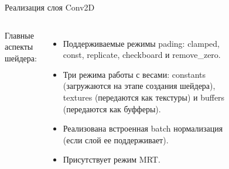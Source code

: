\documentclass[aspectratio=169,xcolor=dvipsnames]{beamer}
\begin{document}
\begin{frame}{Реализация слоя Conv2D}
    \begin{columns}[] %

        Главные аспекты шейдера:
        \begin{itemize}
            \item Поддерживаемые режимы pading: clamped, const, replicate, checkboard и remove\_zero.
            \item Три режима работы с весами: constants (загружаются на этапе создания шейдера), textures (передаются как текстуры) и buffers (передаются как буфферы).
            \item Реализована встроенная batch нормализация (если слой ее поддерживает).
            \item Присутствует режим MRT.
        \end{itemize}

        \begin{figure}[h]
            \label{ris:ORTModelData}
        \end{figure}
        
    \end{columns}
\end{frame}
\end{document}
